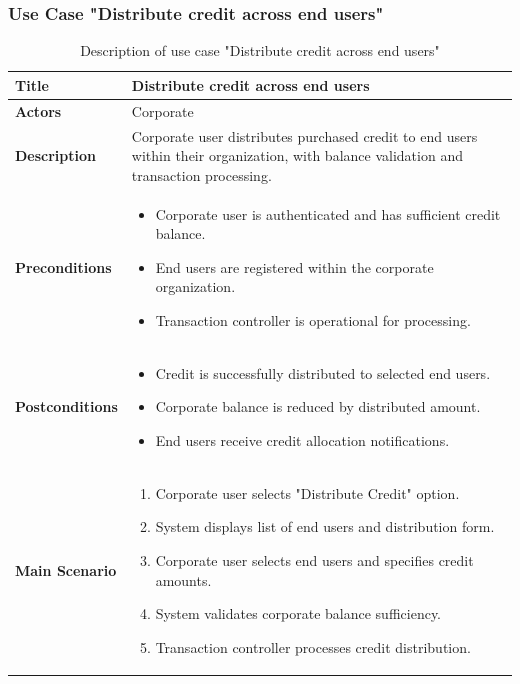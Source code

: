 \subsubsection{Use Case "Distribute credit across end users"}
\begin{longtable}{|p{}|p{}|}
  \caption{Description of use case "Distribute credit across end users"}
  \label{tab:uc_distribute_credit} \\
  \hline
  \textbf{Title} & Distribute credit across end users \\ \hline
  \textbf{Actors} & Corporate \\ \hline
  \textbf{Description} & Corporate user distributes purchased credit to end users within their organization, with balance validation and transaction processing. \\ \hline
  \textbf{Preconditions} & 
    \begin{itemize}[nosep,leftmargin=*]
      \item Corporate user is authenticated and has sufficient credit balance.
      \item End users are registered within the corporate organization.
      \item Transaction controller is operational for processing.
    \end{itemize} \\ \hline
  \textbf{Postconditions} & 
    \begin{itemize}[nosep,leftmargin=*]
      \item Credit is successfully distributed to selected end users.
      \item Corporate balance is reduced by distributed amount.
      \item End users receive credit allocation notifications.
    \end{itemize} \\ \hline
  \textbf{Main Scenario} &
    \begin{enumerate}[nosep,leftmargin=*]
      \item Corporate user selects "Distribute Credit" option.
      \item System displays list of end users and distribution form.
      \item Corporate user selects end users and specifies credit amounts.
      \item System validates corporate balance sufficiency.
      \item Transaction controller processes credit distribution.

\end{enumerate}
\end{longtable}
